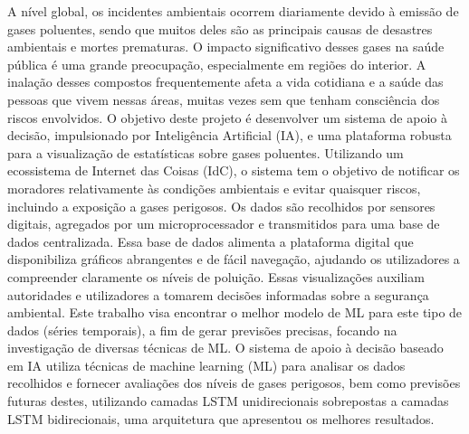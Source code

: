\documentclass[12pt,a4paper]{article}
\begin{document}
                                      {A nível global, os incidentes ambientais ocorrem diariamente devido à emissão de gases poluentes, 
                                      sendo que muitos deles são as principais causas de desastres ambientais e mortes prematuras. 
                                      O impacto significativo desses gases na saúde pública é uma grande preocupação, especialmente em 
                                      regiões do interior. A inalação desses compostos frequentemente afeta a vida cotidiana e a saúde das 
                                      pessoas que vivem nessas áreas, muitas vezes sem que tenham consciência dos riscos envolvidos. O objetivo 
                                      deste projeto é desenvolver um sistema de apoio à decisão, impulsionado por Inteligência Artificial (IA), 
                                      e uma plataforma robusta para a visualização de estatísticas sobre gases poluentes. Utilizando um ecossistema 
                                      de Internet das Coisas (IdC), o sistema tem o objetivo de notificar os moradores relativamente às 
                                      condições ambientais e evitar quaisquer riscos, incluindo a exposição a gases perigosos. Os dados são 
                                      recolhidos por sensores digitais, agregados por um microprocessador e transmitidos para uma base de dados 
                                      centralizada. Essa base de dados alimenta a plataforma digital que disponibiliza gráficos abrangentes 
                                      e de fácil navegação, ajudando os utilizadores a compreender claramente os níveis de poluição. Essas 
                                      visualizações auxiliam autoridades e utilizadores a tomarem decisões informadas sobre a segurança ambiental.
                                      Este trabalho visa encontrar o melhor modelo de ML para este tipo de dados (séries temporais), 
                                      a fim de gerar previsões precisas, focando na investigação de diversas técnicas de ML. 
                                      O sistema de apoio à decisão baseado em IA utiliza técnicas de machine learning (ML) para analisar 
                                      os dados recolhidos e fornecer avaliações dos níveis de gases perigosos, bem como previsões futuras 
                                      destes, utilizando camadas LSTM unidirecionais sobrepostas a camadas LSTM bidirecionais, 
                                      uma arquitetura que apresentou os melhores resultados.}
\end{document}

